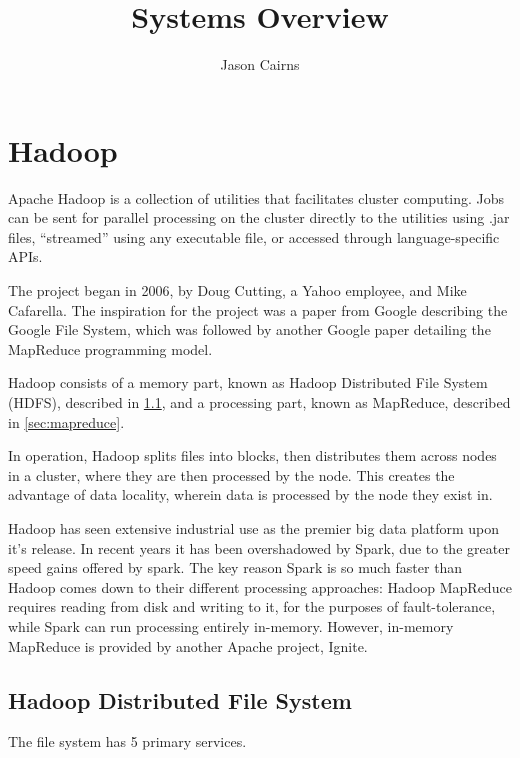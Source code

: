 \documentclass[10pt,a4paper]{article}
\begin{document}
\title{Systems Overview}
\author{Jason Cairns}
\maketitle{}

\section{Hadoop}
\label{sec:hadoop-1}
\nocite{dean2004mapreduce}
\nocite{ghemawat2003google}
\nocite{shvachko2010hadoop}
\nocite{zheludkov2017high}
\nocite{akidau2013millwheel}
Apache Hadoop is a collection of utilities that facilitates cluster
computing. Jobs can be sent for parallel processing on the cluster
directly to the utilities using .jar files, ``streamed'' using any
executable file, or accessed through language-specific APIs.

The project began in 2006, by Doug Cutting, a Yahoo employee, and Mike
Cafarella. The inspiration for the project was a paper from Google
describing the Google File System, which was followed by another
Google paper detailing the MapReduce programming model.

Hadoop consists of a memory part, known as Hadoop Distributed File
System (HDFS), described in \ref{sec:hdfs}, and a processing part,
known as MapReduce, described in \ref{sec:mapreduce}.

In operation, Hadoop splits files into blocks, then distributes them
across nodes in a cluster, where they are then processed by the node.
This creates the advantage of data locality, wherein data is processed
by the node they exist in.

Hadoop has seen extensive industrial use as the premier big data
platform upon it's release. In recent years it has been overshadowed
by Spark, due to the greater speed gains offered by spark. The key
reason Spark is so much faster than Hadoop comes down to their
different processing approaches: Hadoop MapReduce requires reading
from disk and writing to it, for the purposes of fault-tolerance,
while Spark can run processing entirely in-memory. However, in-memory
MapReduce is provided by another Apache project, Ignite.

\subsection{Hadoop Distributed File System}
\label{sec:hdfs}

The file system has 5 primary services.
\end{document}

